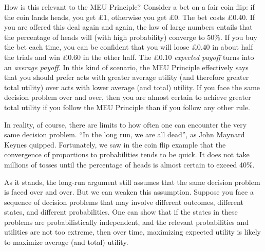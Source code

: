 How is this relevant to the MEU Principle? Consider a bet on a fair coin flip:
if the coin lands heads, you get £1, otherwise you get £0. The bet costs £0.40.
If you are offered this deal again and again, the law of large numbers entails
that the percentage of heads will (with high probability) converge to 50\%. If
you buy the bet each time, you can be confident that you will loose £0.40 in
about half the trials and win £0.60 in the other half. The £0.10 \emph{expected
  payoff} turns into an \emph{average payoff}. In this kind of scenario, the MEU
Principle effectively says that you should prefer acts with greater average
utility (and therefore greater total utility) over acts with lower average (and
total) utility. If you face the same decision problem over and over, then you
are almost certain to achieve greater total utility if you follow the MEU
Principle than if you follow any other rule.

In reality, of course, there are limits to how often one can encounter the very
same decision problem. ``In the long run, we are all dead'', as John Maynard
Keynes quipped. Fortunately, we saw in the coin flip example that the
convergence of proportions to probabilities tends to be quick. It does not take
millions of tosses until the percentage of heads is almost certain to exceed
40\%.

As it stands, the long-run argument still assumes that the same decision problem
is faced over and over. But we can weaken this assumption. Suppose you face a
sequence of decision problems that may involve different outcomes, different
states, and different probabilities. One can show that if the states in these
problems are probabilistically independent, and the relevant probabilities and
utilities are not too extreme, then over time, maximizing expected utility is
likely to maximize average (and total) utility.


